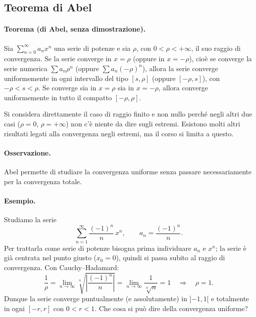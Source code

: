 \subsection{Teorema di Abel}

\paragraph{Teorema (di Abel, senza dimostrazione).}
Sia $\sum_{n=0}^{\infty} a_n x^n$ una serie di potenze e sia $\rho$, con $0<\rho<+\infty$, il suo raggio di
convergenza. Se la serie converge in $x=\rho$ (oppure in $x=-\rho$), cioè se converge la serie numerica
$\sum a_n \rho^n$ (oppure $\sum a_n (-\rho)^n$), allora la serie converge uniformemente in ogni intervallo del
tipo $[s,\rho]$ (oppure $[-\rho,s]$), con $-\rho<s<\rho$. Se converge sia in $x=\rho$ sia in $x=-\rho$, allora
converge uniformemente in tutto il compatto $[-\rho,\rho]$.

Si considera direttamente il caso di raggio finito e non nullo perché negli altri due casi ($\rho=0$,
$\rho=+\infty$) non c'è niente da dire sugli estremi. Esistono molti altri risultati legati alla convergenza
negli estremi, ma il corso si limita a questo.

\paragraph{Osservazione.}
Abel permette di studiare la convergenza uniforme senza passare necessariamente per la convergenza totale.

\paragraph{Esempio.}
Studiamo la serie
\[
  \sum_{n=1}^{\infty} \frac{(-1)^n}{n}\, x^n , \qquad a_n = \frac{(-1)^n}{n} .
\]
Per trattarla come serie di potenze bisogna prima individuare $a_n$ e $x^n$; la serie è già centrata nel punto
giusto ($x_0=0$), quindi si passa subito al raggio di convergenza. Con Cauchy--Hadamard:
\[
  \frac{1}{\rho} = \lim_{n\to\infty} \sqrt[n]{\left|\frac{(-1)^n}{n}\right|}
  = \lim_{n\to\infty} \frac{1}{\sqrt[n]{n}} = 1
  \quad\Longrightarrow\quad \rho = 1 .
\]
Dunque la serie converge puntualmente (e assolutamente) in $]{-1},1[$ e totalmente in ogni $[-r,r]$ con
$0<r<1$. Che cosa si può dire della convergenza uniforme?

